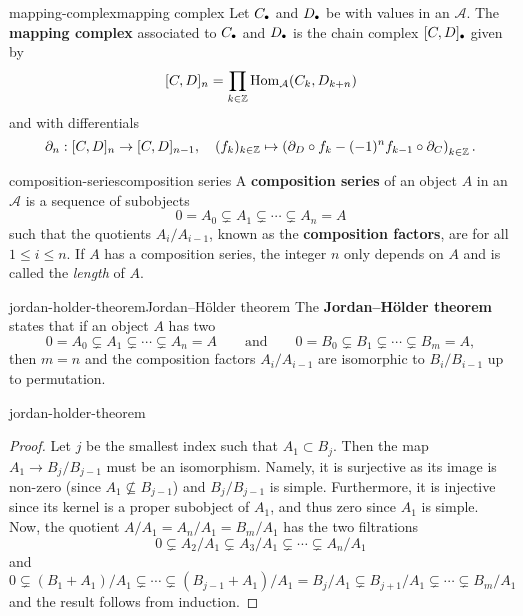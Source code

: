 \begin{topic}{mapping-complex}{mapping complex}
    Let $C_\bdot$ and $D_\bdot$ be  with values in an  $\mathcal{A}$. The \textbf{mapping complex} associated to $C_\bdot$ and $D_\bdot$ is the chain complex $[C, D] _\bdot$ given by
    \[ [C, D]_n = \prod_{k \in \mathbb{Z}} \operatorname{Hom}_\mathcal{A}(C_k, D_{k + n}) \]
    and with differentials
    \[ \partial_n : [C, D]_n \to [C, D]_{n - 1}, \quad (f_k)_{k \in \mathbb{Z}} \mapsto \left(\partial_D \circ f_k - (-1)^n f_{k - 1} \circ \partial_C \right)_{k \in \mathbb{Z}} . \]
\end{topic}

\begin{topic}{composition-series}{composition series}
    A \textbf{composition series} of an object $A$ in an  $\mathcal{A}$ is a sequence of subobjects
    \[ 0 = A_0 \subsetneq A_1 \subsetneq \cdots \subsetneq A_n = A \]
    such that the quotients $A_i/A_{i - 1}$, known as the \textbf{composition factors}, are  for all $1 \le i \le n$. If $A$ has a composition series, the integer $n$ only depends on $A$ and is called the \textit{length} of $A$.
\end{topic}

\begin{topic}{jordan-holder-theorem}{Jordan--Hölder theorem}
    The \textbf{Jordan--Hölder theorem} states that if an object $A$ has two 
    \[ 0 = A_0 \subsetneq A_1 \subsetneq \cdots \subsetneq A_n = A \qquad \text{and} \qquad 0 = B_0 \subsetneq B_1 \subsetneq \cdots \subsetneq B_m = A , \]
    then $m = n$ and the composition factors $A_i/A_{i - 1}$ are isomorphic to $B_i/B_{i - 1}$ up to permutation.
\end{topic}

\begin{example}{jordan-holder-theorem}
    \begin{proof}
        Let $j$ be the smallest index such that $A_1 \subset B_j$. Then the map $A_1 \to B_j/B_{j - 1}$ must be an isomorphism. Namely, it is surjective as its image is non-zero (since $A_1 \nsubseteq B_{j - 1}$) and $B_j/B_{j - 1}$ is simple. Furthermore, it is injective since its kernel is a proper subobject of $A_1$, and thus zero since $A_1$ is simple. Now, the quotient $A/A_1 = A_n/A_1 = B_m/A_1$ has the two filtrations
        \[ 0 \subsetneq A_2/A_1 \subsetneq A_3/A_1 \subsetneq \cdots \subsetneq A_n/A_1 \]
        and
        \[ 0 \subsetneq (B_1 + A_1)/A_1 \subsetneq \cdots \subsetneq (B_{j - 1} + A_1)/A_1 = B_j/A_1 \subsetneq B_{j + 1}/A_1 \subsetneq \cdots \subsetneq B_m/A_1 \]
        and the result follows from induction.    
    \end{proof}
\end{example}


